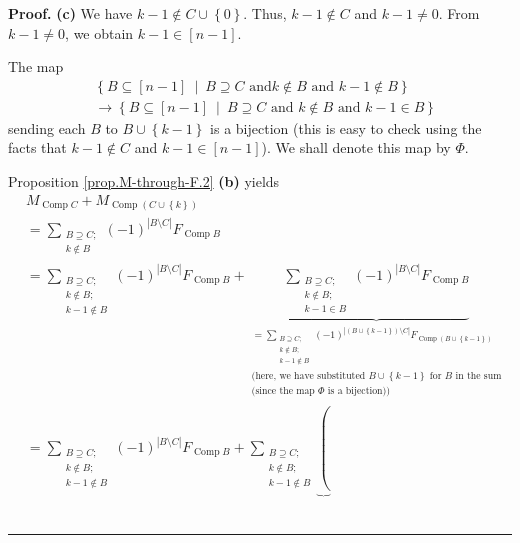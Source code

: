 \documentclass[numbers=enddot,12pt,final,onecolumn,notitlepage]{scrartcl}%
\theoremstyle{definition}
\newenvironment{proof}[1][Proof]{\noindent\textbf{#1.} }{\ \rule{0.5em}{0.5em}}
\newenvironment{verlong}{}{}
\let\sumnonlimits\sum
\renewcommand{\sum}{\sumnonlimits\limits}
\begin{document}
\begin{verlong}
\begin{proof}
\textbf{(c)} We have $k-1\notin C\cup\left\{  0\right\}  $. Thus, $k-1\notin
C$ and $k-1\neq0$. From $k-1\neq0$, we obtain $k-1\in\left[  n-1\right]  $.

The map%
\begin{align}
&  \left\{  B\subseteq\left[  n-1\right]  \ \mid\ B\supseteq C\text{ and
}k\notin B\text{ and }k-1\notin B\right\} \nonumber\\
&  \rightarrow\left\{  B\subseteq\left[  n-1\right]  \ \mid\ B\supseteq
C\text{ and }k\notin B\text{ and }k-1\in B\right\} \nonumber
\end{align}
sending each $B$ to $B\cup\left\{  k-1\right\}  $ is a bijection (this is easy
to check using the facts that $k-1\notin C$ and $k-1\in\left[  n-1\right]  $).
We shall denote this map by $\Phi$.

Proposition \ref{prop.M-through-F.2} \textbf{(b)} yields
\begin{align*}
&  M_{\operatorname*{Comp}C}+M_{\operatorname*{Comp}\left(  C\cup\left\{
k\right\}  \right)  }\\
&  =\sum_{\substack{B\supseteq C;\\k\notin B}}\left(  -1\right)  ^{\left\vert
B\setminus C\right\vert }F_{\operatorname*{Comp}B}\\
&  =\sum_{\substack{B\supseteq C;\\k\notin B;\\k-1\notin B}}\left(  -1\right)
^{\left\vert B\setminus C\right\vert }F_{\operatorname*{Comp}B}%
+\underbrace{\sum_{\substack{B\supseteq C;\\k\notin B;\\k-1\in B}}\left(
-1\right)  ^{\left\vert B\setminus C\right\vert }F_{\operatorname*{Comp}B}%
}_{\substack{=\sum_{\substack{B\supseteq C;\\k\notin B;\\k-1\notin B}}\left(
-1\right)  ^{\left\vert \left(  B\cup\left\{  k-1\right\}  \right)  \setminus
C\right\vert }F_{\operatorname*{Comp}\left(  B\cup\left\{  k-1\right\}
\right)  }\\\text{(here, we have substituted }B\cup\left\{  k-1\right\}
\text{ for }B\text{ in the sum}\\\text{(since the map }\Phi\text{ is a
bijection))}}}\\
&  =\sum_{\substack{B\supseteq C;\\k\notin B;\\k-1\notin B}}\left(  -1\right)
^{\left\vert B\setminus C\right\vert }F_{\operatorname*{Comp}B}+\sum
_{\substack{B\supseteq C;\\k\notin B;\\k-1\notin B}}\underbrace{\left(
}
\end{align*}
\end{proof}
\end{verlong}
\end{document}
